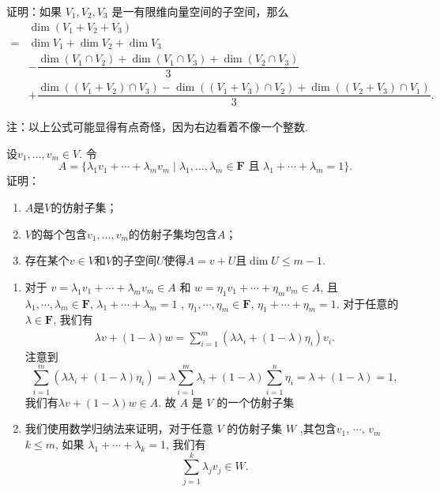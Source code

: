 \begin{exercise}
\begin{exgroup}
\begin{answer}
        \end{answer}

        \item 证明：如果 $V_1,V_2,V_3$ 是一有限维向量空间的子空间，那么
        \begin{align*}
            &\dim(V_1+V_2+V_3) \\
            ={} & \dim V_1+\dim V_2+\dim V_3 \\
            &-\dfrac{\dim(V_1\cap V_2)+\dim(V_1\cap V_3)+\dim(V_2\cap V_3)}{3} \\
            &+\dfrac{\dim((V_1 + V_2) \cap V_3) - \dim((V_1 + V_3) \cap V_2) + \dim((V_2 + V_3) \cap V_1)}{3}.
        \end{align*}

        注：以上公式可能显得有点奇怪，因为右边看着不像一个整数.
        \begin{answer}

        \end{answer}

        \item 设$v_1,\ldots,v_m\in V$. 令
        \[A=\{\lambda_1v_1+\cdots+\lambda_mv_m \mid \lambda_1,\ldots,\lambda_m\in\mathbf{F}\text{~且~}\lambda_1+\cdots+\lambda_m=1\}.\]
        证明：
        \begin{enumerate}
            \item $A$是$V$的仿射子集；

            \item $V$的每个包含$v_1,\ldots,v_m$的仿射子集均包含$A$；

            \item 存在某个$v\in V$和$V$的子空间$U$使得$A=v+U$且$\dim U\leqslant m-1$.
        \end{enumerate}
    \begin{answer}
        \begin{enumerate}
            \item 对于 $v=\lambda_1 v_1+\cdots+\lambda_m v_m\in A$ 和 $w=\eta_1 v_1+\cdots+\eta_m v_m\in A$, 且 $\lambda_1,\cdots,\lambda_m\in  \mathbf{F}$, $\lambda_1+\cdots+\lambda_m=1$ , $\eta_1,\cdots,\eta_m\in \mathbf{F}$, $\eta_1+\cdots+\eta_m=1$. 对于任意的$\lambda\in \mathbf{F}$, 我们有
            \begin{align*}
                \lambda v+(1-\lambda) w=\sum_{i=1}^m(\lambda\lambda_i+(1-\lambda)\eta_i)v_i.
            \end{align*}
            注意到
            \[ \sum_{i=1}^m(\lambda\lambda_i+(1-\lambda)\eta_i)=\lambda\sum_{i=1}^m\lambda_i+(1-\lambda)\sum_{i=1}^n\eta_i=\lambda+(1-\lambda)=1, \]
            我们有$\lambda v+(1-\lambda) w\in A$. 故 $A$ 是 $V$ 的一个仿射子集
        \item 我们使用数学归纳法来证明，对于任意 $V$ 的仿射子集 $W$ ,其包含$v_1$, $\cdots$, $v_m$$k\le m$,
            如果 $\lambda_1+\cdots+\lambda_k=1$,
            我们有 \[ \sum_{j=1}^k\lambda_jv_j\in W. \]


\end{enumerate}
\end{answer}
\end{exgroup}
\end{exercise}
